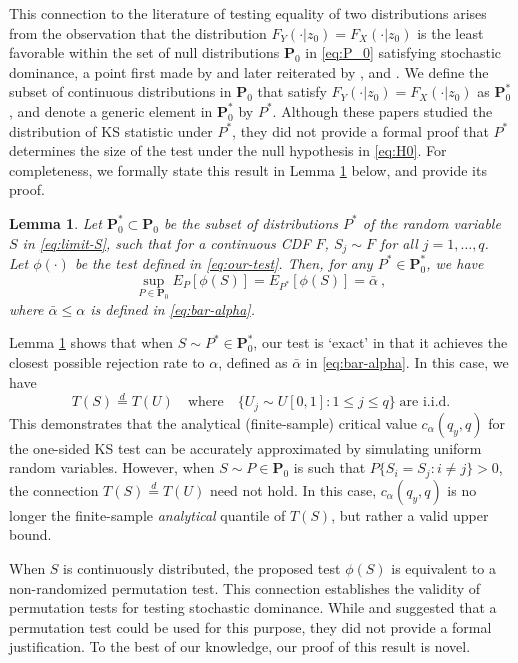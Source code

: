 \documentclass[11pt]{article}
\numberwithin{equation}{section}
\newtheorem{lemma}{Lemma}%
\begin{document}
This connection to the literature of testing equality of two distributions arises from the observation that the distribution \(F_Y(\cdot|z_{0}) = F_X(\cdot|z_{0})\) is the least favorable within the set of null distributions \(\mathbf{P}_0\) in \eqref{eq:P_0} satisfying stochastic dominance, a point first made by \cite{lehmann:1951} and later reiterated by \cite{hodges:1958,mcfadden:1989}, and \cite{goldman/kaplan:2018}. We define the subset of continuous distributions in \(\mathbf{P}_0\) that satisfy \(F_Y(\cdot|z_{0}) = F_X(\cdot|z_{0})\) as \(\mathbf{P}^*_0\), and denote a generic element in \(\mathbf{P}^*_0\) by \(P^*\). Although these papers studied the distribution of KS statistic under \(P^*\), they did not provide a formal proof that \(P^*\) determines the size of the test under the null hypothesis in \eqref{eq:H0}. For completeness, we formally state this result in Lemma \ref{lem:limit-exact} below, and provide its proof.

\begin{lemma}\label{lem:limit-exact}
Let \(\mathbf{P}^*_0 \subset \mathbf{P}_0\) be the subset of distributions \(P^*\) of the random variable \(S\) in \eqref{eq:limit-S}, such that for a continuous CDF $F$, \(S_j \sim F\) for all \(j = 1, \ldots, q\). Let \(\phi(\cdot)\) be the test defined in \eqref{eq:our-test}. Then, for any $P^*\in \mathbf P^*_0$, we have
\[
\sup_{P \in \mathbf{P}_0} E_P[\phi(S)] = E_{P^*}[\phi(S)] = \bar{\alpha}~,
\]
where $\bar{\alpha}\le \alpha $ is defined in \eqref{eq:bar-alpha}. 
\end{lemma}

Lemma \ref{lem:limit-exact} shows that when $S \sim P^*\in \mathbf P^*_0$, our test is `exact' in that it achieves the closest possible rejection rate to $\alpha$, defined as $\bar{\alpha}$ in \eqref{eq:bar-alpha}. In this case, we have 
  $$ T(S) \stackrel{d}{=} T(U) \quad \text{where}\quad \{U_j \sim U[0,1]: 1 \leq j \leq q\} \; \text{are i.i.d.}$$
This demonstrates that the analytical (finite-sample) critical value $c_{\alpha}(q_y, q)$ for the one-sided KS test can be accurately approximated by simulating uniform random variables. However, when $S \sim P\in \mathbf P_0$ is such that $P\{S_i = S_{j}: i\not=j\} > 0$, the connection $T(S) \stackrel{d}{=} T(U)$ need not hold. In this case, $c_{\alpha}(q_y, q)$ is no longer the finite-sample \emph{analytical} quantile of $T(S)$, but rather a valid upper bound.

When \(S\) is continuously distributed, the proposed test \(\phi(S)\) is equivalent to a non-randomized permutation test. This connection establishes the validity of permutation tests for testing stochastic dominance. While \cite{hodges:1958} and \cite{mcfadden:1989} suggested that a permutation test could be used for this purpose, they did not provide a formal justification. To the best of our knowledge, our proof of this result is novel.
\end{document}
